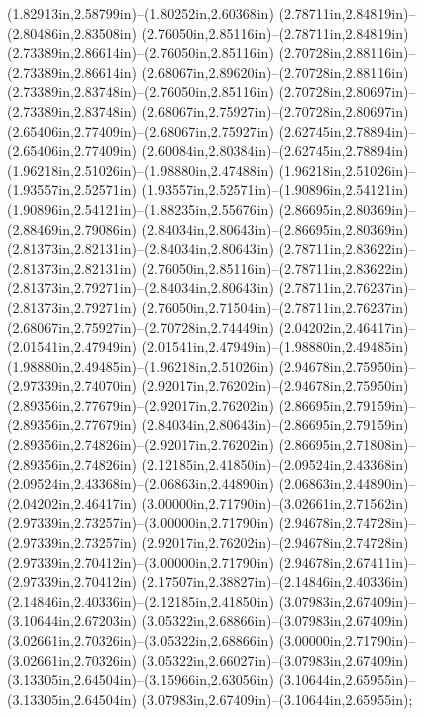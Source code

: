 (1.82913in,2.58799in)--(1.80252in,2.60368in) (2.78711in,2.84819in)--(2.80486in,2.83508in) (2.76050in,2.85116in)--(2.78711in,2.84819in) (2.73389in,2.86614in)--(2.76050in,2.85116in) (2.70728in,2.88116in)--(2.73389in,2.86614in) (2.68067in,2.89620in)--(2.70728in,2.88116in) (2.73389in,2.83748in)--(2.76050in,2.85116in) (2.70728in,2.80697in)--(2.73389in,2.83748in) (2.68067in,2.75927in)--(2.70728in,2.80697in) (2.65406in,2.77409in)--(2.68067in,2.75927in) (2.62745in,2.78894in)--(2.65406in,2.77409in) (2.60084in,2.80384in)--(2.62745in,2.78894in) (1.96218in,2.51026in)--(1.98880in,2.47488in) (1.96218in,2.51026in)--(1.93557in,2.52571in) (1.93557in,2.52571in)--(1.90896in,2.54121in) (1.90896in,2.54121in)--(1.88235in,2.55676in) (2.86695in,2.80369in)--(2.88469in,2.79086in) (2.84034in,2.80643in)--(2.86695in,2.80369in) (2.81373in,2.82131in)--(2.84034in,2.80643in) (2.78711in,2.83622in)--(2.81373in,2.82131in) (2.76050in,2.85116in)--(2.78711in,2.83622in) (2.81373in,2.79271in)--(2.84034in,2.80643in) (2.78711in,2.76237in)--(2.81373in,2.79271in) (2.76050in,2.71504in)--(2.78711in,2.76237in) (2.68067in,2.75927in)--(2.70728in,2.74449in) (2.04202in,2.46417in)--(2.01541in,2.47949in) (2.01541in,2.47949in)--(1.98880in,2.49485in) (1.98880in,2.49485in)--(1.96218in,2.51026in) (2.94678in,2.75950in)--(2.97339in,2.74070in) (2.92017in,2.76202in)--(2.94678in,2.75950in) (2.89356in,2.77679in)--(2.92017in,2.76202in) (2.86695in,2.79159in)--(2.89356in,2.77679in) (2.84034in,2.80643in)--(2.86695in,2.79159in) (2.89356in,2.74826in)--(2.92017in,2.76202in) (2.86695in,2.71808in)--(2.89356in,2.74826in) (2.12185in,2.41850in)--(2.09524in,2.43368in) (2.09524in,2.43368in)--(2.06863in,2.44890in) (2.06863in,2.44890in)--(2.04202in,2.46417in) (3.00000in,2.71790in)--(3.02661in,2.71562in) (2.97339in,2.73257in)--(3.00000in,2.71790in) (2.94678in,2.74728in)--(2.97339in,2.73257in) (2.92017in,2.76202in)--(2.94678in,2.74728in) (2.97339in,2.70412in)--(3.00000in,2.71790in) (2.94678in,2.67411in)--(2.97339in,2.70412in) (2.17507in,2.38827in)--(2.14846in,2.40336in) (2.14846in,2.40336in)--(2.12185in,2.41850in) (3.07983in,2.67409in)--(3.10644in,2.67203in) (3.05322in,2.68866in)--(3.07983in,2.67409in) (3.02661in,2.70326in)--(3.05322in,2.68866in) (3.00000in,2.71790in)--(3.02661in,2.70326in) (3.05322in,2.66027in)--(3.07983in,2.67409in) (3.13305in,2.64504in)--(3.15966in,2.63056in) (3.10644in,2.65955in)--(3.13305in,2.64504in) (3.07983in,2.67409in)--(3.10644in,2.65955in);
